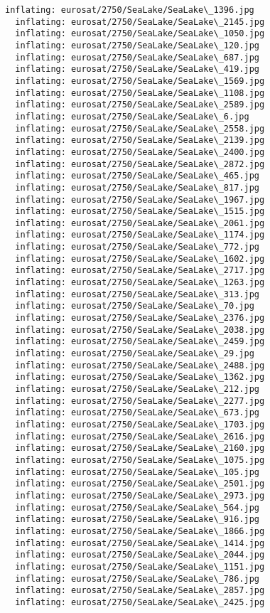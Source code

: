 \documentclass[11pt]{article}
\begin{document}
\begin{Verbatim}[commandchars=\\\{\}]
  inflating: eurosat/2750/SeaLake/SeaLake\_1396.jpg
  inflating: eurosat/2750/SeaLake/SeaLake\_2145.jpg
  inflating: eurosat/2750/SeaLake/SeaLake\_1050.jpg
  inflating: eurosat/2750/SeaLake/SeaLake\_120.jpg
  inflating: eurosat/2750/SeaLake/SeaLake\_687.jpg
  inflating: eurosat/2750/SeaLake/SeaLake\_419.jpg
  inflating: eurosat/2750/SeaLake/SeaLake\_1569.jpg
  inflating: eurosat/2750/SeaLake/SeaLake\_1108.jpg
  inflating: eurosat/2750/SeaLake/SeaLake\_2589.jpg
  inflating: eurosat/2750/SeaLake/SeaLake\_6.jpg
  inflating: eurosat/2750/SeaLake/SeaLake\_2558.jpg
  inflating: eurosat/2750/SeaLake/SeaLake\_2139.jpg
  inflating: eurosat/2750/SeaLake/SeaLake\_2400.jpg
  inflating: eurosat/2750/SeaLake/SeaLake\_2872.jpg
  inflating: eurosat/2750/SeaLake/SeaLake\_465.jpg
  inflating: eurosat/2750/SeaLake/SeaLake\_817.jpg
  inflating: eurosat/2750/SeaLake/SeaLake\_1967.jpg
  inflating: eurosat/2750/SeaLake/SeaLake\_1515.jpg
  inflating: eurosat/2750/SeaLake/SeaLake\_2061.jpg
  inflating: eurosat/2750/SeaLake/SeaLake\_1174.jpg
  inflating: eurosat/2750/SeaLake/SeaLake\_772.jpg
  inflating: eurosat/2750/SeaLake/SeaLake\_1602.jpg
  inflating: eurosat/2750/SeaLake/SeaLake\_2717.jpg
  inflating: eurosat/2750/SeaLake/SeaLake\_1263.jpg
  inflating: eurosat/2750/SeaLake/SeaLake\_313.jpg
  inflating: eurosat/2750/SeaLake/SeaLake\_70.jpg
  inflating: eurosat/2750/SeaLake/SeaLake\_2376.jpg
  inflating: eurosat/2750/SeaLake/SeaLake\_2038.jpg
  inflating: eurosat/2750/SeaLake/SeaLake\_2459.jpg
  inflating: eurosat/2750/SeaLake/SeaLake\_29.jpg
  inflating: eurosat/2750/SeaLake/SeaLake\_2488.jpg
  inflating: eurosat/2750/SeaLake/SeaLake\_1362.jpg
  inflating: eurosat/2750/SeaLake/SeaLake\_212.jpg
  inflating: eurosat/2750/SeaLake/SeaLake\_2277.jpg
  inflating: eurosat/2750/SeaLake/SeaLake\_673.jpg
  inflating: eurosat/2750/SeaLake/SeaLake\_1703.jpg
  inflating: eurosat/2750/SeaLake/SeaLake\_2616.jpg
  inflating: eurosat/2750/SeaLake/SeaLake\_2160.jpg
  inflating: eurosat/2750/SeaLake/SeaLake\_1075.jpg
  inflating: eurosat/2750/SeaLake/SeaLake\_105.jpg
  inflating: eurosat/2750/SeaLake/SeaLake\_2501.jpg
  inflating: eurosat/2750/SeaLake/SeaLake\_2973.jpg
  inflating: eurosat/2750/SeaLake/SeaLake\_564.jpg
  inflating: eurosat/2750/SeaLake/SeaLake\_916.jpg
  inflating: eurosat/2750/SeaLake/SeaLake\_1866.jpg
  inflating: eurosat/2750/SeaLake/SeaLake\_1414.jpg
  inflating: eurosat/2750/SeaLake/SeaLake\_2044.jpg
  inflating: eurosat/2750/SeaLake/SeaLake\_1151.jpg
  inflating: eurosat/2750/SeaLake/SeaLake\_786.jpg
  inflating: eurosat/2750/SeaLake/SeaLake\_2857.jpg
  inflating: eurosat/2750/SeaLake/SeaLake\_2425.jpg

\end{Verbatim}
\end{document}
